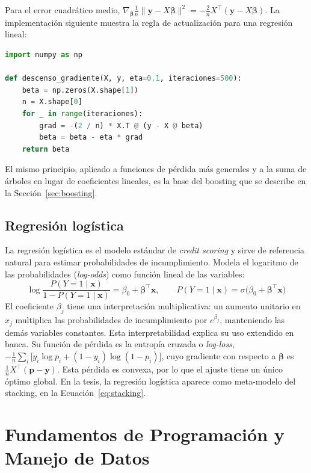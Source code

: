 Para el error cuadrático medio, $\nabla_{\boldsymbol{\beta}}\frac{1}{n}\|\mathbf{y}-X\boldsymbol{\beta}\|^2 = -\frac{2}{n}X^\top(\mathbf{y}-X\boldsymbol{\beta})$. La implementación siguiente muestra la regla de actualización para una regresión lineal:
\begin{lstlisting}[language=Python, caption={Descenso por gradiente para regresión lineal con error cuadrático medio}, label={lst:descenso}]
import numpy as np

def descenso_gradiente(X, y, eta=0.1, iteraciones=500):
    beta = np.zeros(X.shape[1])
    n = X.shape[0]
    for _ in range(iteraciones):
        grad = -(2 / n) * X.T @ (y - X @ beta)
        beta = beta - eta * grad
    return beta
\end{lstlisting}
El mismo principio, aplicado a funciones de pérdida más generales y a la suma de árboles en lugar de coeficientes lineales, es la base del boosting que se describe en la Sección~\ref{sec:boosting}.

\subsection{Regresión logística}\label{sec:logit}
La regresión logística es el modelo estándar de \textit{credit scoring} y sirve de referencia natural para estimar probabilidades de incumplimiento. Modela el logaritmo de las probabilidades (\textit{log-odds}) como función lineal de las variables:
\begin{equation}
\log\frac{P(Y=1\mid\mathbf{x})}{1-P(Y=1\mid\mathbf{x})} = \beta_0 + \boldsymbol{\beta}^\top\mathbf{x}, \qquad P(Y=1\mid\mathbf{x}) = \sigma\big(\beta_0+\boldsymbol{\beta}^\top\mathbf{x}\big)
\label{eq:logit}
\end{equation}
El coeficiente $\beta_j$ tiene una interpretación multiplicativa: un aumento unitario en $x_j$ multiplica las probabilidades de incumplimiento por $e^{\beta_j}$, manteniendo las demás variables constantes. Esta interpretabilidad explica su uso extendido en banca. Su función de pérdida es la entropía cruzada o \textit{log-loss}, $-\frac{1}{n}\sum_i\big[y_i\log p_i+(1-y_i)\log(1-p_i)\big]$, cuyo gradiente con respecto a $\boldsymbol{\beta}$ es $\frac{1}{n}X^\top(\mathbf{p}-\mathbf{y})$. Esta pérdida es convexa, por lo que el ajuste tiene un único óptimo global. En la tesis, la regresión logística aparece como meta-modelo del stacking, en la Ecuación~\eqref{eq:stacking}.

\section{Fundamentos de Programación y Manejo de Datos}\label{sec:fund_prog}

